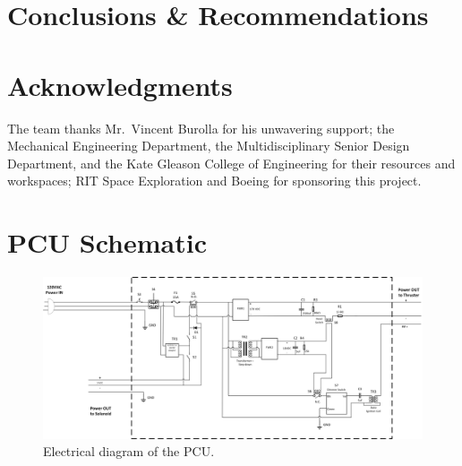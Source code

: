 \documentclass[journal]{IEEEtran}
\begin{document}
\section{Conclusions \& Recommendations}

\section*{Acknowledgments}
The team thanks Mr.~Vincent Burolla for his unwavering support; the Mechanical Engineering Department, the Multidisciplinary Senior Design Department, and the Kate Gleason College of Engineering for their resources and workspaces; RIT Space Exploration and Boeing for sponsoring this project.





\onecolumn
\appendices{}
\section{PCU Schematic}
\begin{figure}[h!]
  \includegraphics[angle=90,height=.9\vsize,keepaspectratio]{figs/PCU_Schematic_No_AI_4_27_new.png}
  \caption{Electrical diagram of the PCU.}
\label{fig:pcu-schematic}
\end{figure}
\end{document}
